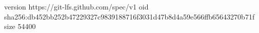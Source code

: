 version https://git-lfs.github.com/spec/v1
oid sha256:db452bb252b47229327c9839188716f3031d47b8d4a59e566ffb65643270b71f
size 54400
